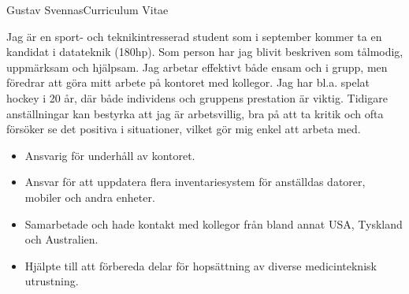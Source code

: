 \documentclass{article}
\begin{document}


\begin{cv}{Gustav Svennas}{Curriculum Vitae}


Jag är en sport- och teknikintresserad student som i september kommer ta en kandidat i datateknik (180hp). Som person har jag blivit beskriven som tålmodig, uppmärksam och hjälpsam. Jag arbetar effektivt både ensam och i grupp, men föredrar att göra mitt arbete på kontoret med kollegor. Jag har bl.a. spelat hockey i 20 år, där både individens och gruppens prestation är viktig. Tidigare anställningar kan bestyrka att jag är arbetsvillig, bra på att ta kritik och ofta försöker se det positiva i situationer, vilket gör mig enkel att arbeta med.



\begin{cvevent}[2022-07][2022-08]
    \begin{itemize}
        \item Ansvarig för underhåll av kontoret.
    \end{itemize}
\end{cvevent}


\begin{cvevent}[2021-03][2021-10]
    \begin{itemize}
        \item Ansvar för att uppdatera flera inventariesystem för anställdas datorer, mobiler och andra enheter.
        \item Samarbetade och hade kontakt med kollegor från bland annat USA, Tyskland och Australien.
    \end{itemize}
\end{cvevent}


\begin{cvevent}[2015-06][2015-07]
    \begin{itemize}
        \item Hjälpte till att förbereda delar för hopsättning av diverse medicinteknisk utrustning.
    \end{itemize}
\end{cvevent}


\end{cv}
\end{document}
